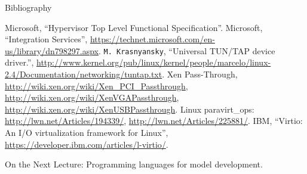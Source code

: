\begin{frame}[allowframebreaks]{Bibliography}
  \begin{thebibliography}{99}
    \bibitem{} Microsoft, ``Hypervisor Top Level Functional Specification''.
    \bibitem{} Microsoft, ``Integration Services'',
      \url{https://technet.microsoft.com/en-us/library/dn798297.aspx}.
    \bibitem{} \texttt{M.~Krasnyansky}, ``Universal TUN/TAP device driver.'',
      \url{http://www.kernel.org/pub/linux/kernel/people/marcelo/linux-2.4/Documentation/networking/tuntap.txt}.
    \bibitem{} Xen Pass-Through, \url{http://wiki.xen.org/wiki/Xen_PCI_Passthrough},
      \url{http://wiki.xen.org/wiki/XenVGAPassthrough},
      \url{http://wiki.xen.org/wiki/XenUSBPassthrough}.
    \bibitem{} Linux paravirt\_ops: \url{http://lwn.net/Articles/194339/},
      \url{http://lwn.net/Articles/225881/}.
    \bibitem{} IBM, ``Virtio: An I/O virtualization framework for Linux'',
      \url{https://developer.ibm.com/articles/l-virtio/}.
  \end{thebibliography}
\end{frame}

\begin{frame}{On the Next Lecture:}
  Programming languages for model development.
\end{frame}

\finalslide



